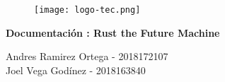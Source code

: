 \documentclass[a4paper,12pt,twoside]{article}
\begin{document}
\pagestyle{empty}

\begin{figure}
  \centering
  \texttt{[image: logo-tec.png]}
  \vspace*{-0.3cm}
\end{figure}

\begin{center}
{\large \rm {} \linebreak}
{\large \rm {} \linebreak}
{\large \rm {} \linebreak}
\end{center}

\baselineskip 30pt

\vspace*{1 cm}

\begin{center}
{\LARGE \bf Documentación : Rust the Future Machine}
\end{center}

\vspace*{2 cm}

\setcounter{footnote}{1}

\renewcommand{\thefootnote}{\fnsymbol{footnote}}
\begin{center}
{\Large \textheight Andres Ramirez Ortega - 2018172107
\\}
{\Large \textheight Joel Vega Godínez - 2018163840
\\}
\vspace*{0.3cm}

 \vspace*{-.5cm} 
\end{center}

\setcounter{footnote}{1}

\vspace*{2 cm}

\baselineskip 17pt
\end{document}
